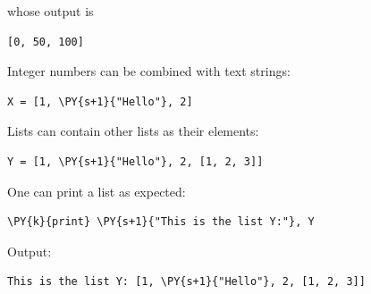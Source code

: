 \noindent
whose output is \\

\begin{ybox}
\begin{Verbatim}[commandchars=\\\{\}]
[0, 50, 100]
\end{Verbatim}
\end{ybox}
\vspace{6mm}

\noindent
Integer numbers can be combined with text strings:\\

\begin{bbox}
\begin{Verbatim}[commandchars=\\\{\}]
X = [1, \PY{s+1}{"Hello"}, 2]
\end{Verbatim}
\end{bbox}
\vspace{6mm}

\noindent
Lists can contain other lists as their elements:\\

\begin{bbox}
\begin{Verbatim}[commandchars=\\\{\}]
Y = [1, \PY{s+1}{"Hello"}, 2, [1, 2, 3]]
\end{Verbatim}
\end{bbox}
\vspace{6mm}

\noindent
One can print a list as expected:\\

\begin{bbox}
\begin{Verbatim}[commandchars=\\\{\}]
\PY{k}{print} \PY{s+1}{"This is the list Y:"}, Y
\end{Verbatim}
\end{bbox}
\vspace{6mm}

\noindent
Output:\\

\begin{ybox}
\begin{Verbatim}[commandchars=\\\{\}]
This is the list Y: [1, \PY{s+1}{"Hello"}, 2, [1, 2, 3]]
\end{Verbatim}
\end{ybox}
\vspace{6mm}

